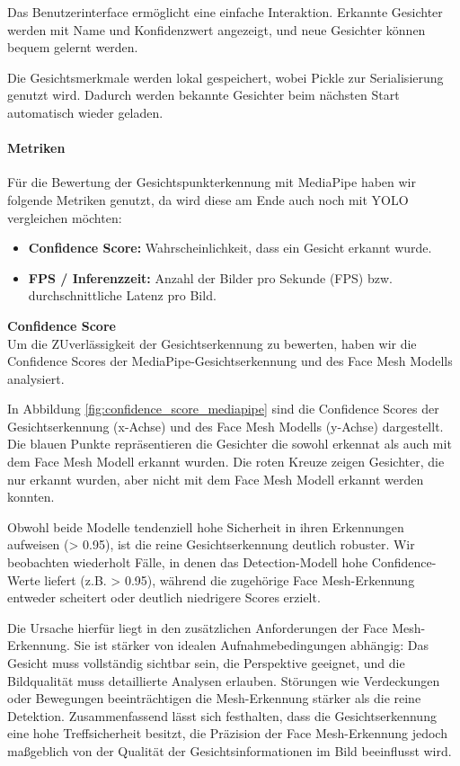 Das Benutzerinterface ermöglicht eine einfache Interaktion.
Erkannte Gesichter werden mit Name und Konfidenzwert angezeigt, und neue Gesichter können bequem gelernt werden.

Die Gesichtsmerkmale werden lokal gespeichert, wobei Pickle zur Serialisierung genutzt wird. Dadurch werden bekannte Gesichter beim nächsten Start automatisch wieder geladen.


\paragraph{Metriken}
Für die Bewertung der Gesichtspunkterkennung mit MediaPipe haben wir folgende Metriken genutzt, da wird diese am Ende auch noch mit YOLO vergleichen möchten:
\begin{itemize}
    \item \textbf{Confidence Score:} Wahrscheinlichkeit, dass ein Gesicht erkannt wurde.
    \item \textbf{FPS / Inferenzzeit:} Anzahl der Bilder pro Sekunde (FPS) bzw. durchschnittliche Latenz pro Bild.
\end{itemize}

\textbf{Confidence Score} \\

Um die ZUverlässigkeit der Gesichtserkennung zu bewerten, haben wir die Confidence Scores der MediaPipe-Gesichtserkennung und des Face Mesh Modells analysiert.

In Abbildung \ref{fig:confidence_score_mediapipe} sind die Confidence Scores der Gesichtserkennung (x-Achse) und des Face Mesh Modells (y-Achse) dargestellt. Die blauen Punkte repräsentieren die Gesichter die sowohl erkennat als auch mit dem Face Mesh Modell erkannt wurden. 
Die roten Kreuze zeigen Gesichter, die nur erkannt wurden, aber nicht mit dem Face Mesh Modell erkannt werden konnten.

Obwohl beide Modelle tendenziell hohe Sicherheit in ihren Erkennungen aufweisen (> 0.95), ist die reine Gesichtserkennung deutlich robuster. Wir beobachten wiederholt Fälle, in denen das Detection-Modell hohe Confidence-Werte liefert (z.B. > 0.95), während die zugehörige Face Mesh-Erkennung entweder scheitert oder deutlich niedrigere Scores erzielt.

Die Ursache hierfür liegt in den zusätzlichen Anforderungen der Face Mesh-Erkennung. Sie ist stärker von idealen Aufnahmebedingungen abhängig: Das Gesicht muss vollständig sichtbar sein, die Perspektive geeignet, und die Bildqualität muss detaillierte Analysen erlauben. 
Störungen wie Verdeckungen oder Bewegungen beeinträchtigen die Mesh-Erkennung stärker als die reine Detektion. Zusammenfassend lässt sich festhalten, dass die Gesichtserkennung eine hohe Treffsicherheit besitzt, die Präzision der Face Mesh-Erkennung jedoch maßgeblich von der Qualität der Gesichtsinformationen im Bild beeinflusst wird.

